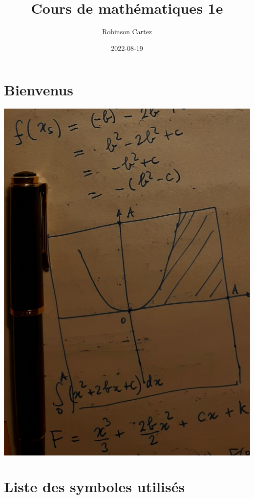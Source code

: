\documentclass[
  12pt,
]{book}
\title{Cours de mathématiques 1e}
\author{Robinson Cartez}
\date{2022-08-19}
\begin{document}
\maketitle

{
\setcounter{tocdepth}{1}
\tableofcontents
}
\hypertarget{bienvenus}{%
\chapter*{Bienvenus}\label{bienvenus}}

\begin{cadre}
\includegraphics{images/cover_cours1e.jpg}

\end{cadre}

\hypertarget{liste-des-symboles-utilisuxe9s}{%
\chapter*{Liste des symboles utilisés}\label{liste-des-symboles-utilisuxe9s}}
\end{document}

